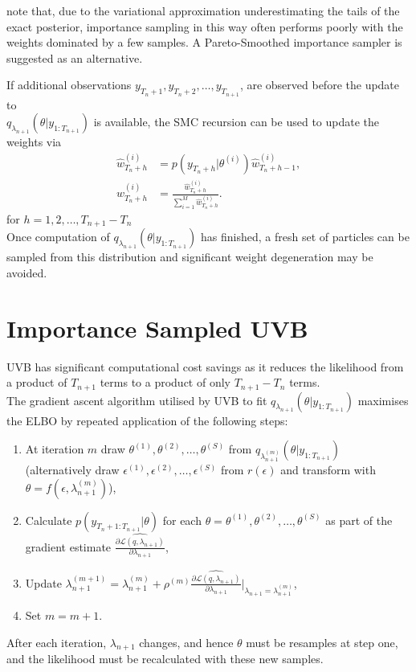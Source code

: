 \documentclass[
12pt, %
onehalfspacing, %
nohyperref, %
headsepline, %
chapterinoneline, %
]{MastersDoctoralThesis} %
\begin{document}
\citet{Yao2018} note that, due to the variational approximation underestimating the tails of the exact posterior, importance sampling in this way often performs poorly with the weights dominated by a few samples. A Pareto-Smoothed importance sampler is suggested as an alternative.

If additional observations $y_{T_n+1}, y_{T_n + 2}, \ldots, y_{T_{n+1}}$, are observed before the update to \\ $q_{\lambda_{n+1}}(\theta | y_{1:T_{n+1}})$ is available, the SMC recursion can be used to update the weights via
\begin{align}
\hat{w}^{(i)}_{T_n+h} &= p(y_{T_n+h} | \theta^{(i)}) \hat{w}^{(i)}_{T_n+h-1}, \label{UVBIS:UpdateWeights} \\
w^{(i)}_{T_n+h} &= \frac{\hat{w}^{(i)}_{T_n+h}}{\sum_{i=1}^M \hat{w}^{(i)}_{T_n+h}}. \label{UVBIS:UpdateWeightsNorm}
\end{align}
for $h = 1, 2, \ldots, T_{n+1} - T_{n}$
\\

Once computation of $q_{\lambda_{n+1}}(\theta | y_{1:T_{n+1}})$ has finished, a fresh set of particles can be sampled from this distribution and significant weight degeneration may be avoided.

\section{Importance Sampled UVB} 
\label{sec:UVBIS}

UVB has significant computational cost savings as it reduces the likelihood from a product of $T_{n+1}$ terms to a product of only $T_{n+1} - T_n$ terms. \\

The gradient ascent algorithm utilised by UVB to fit $q_{\lambda_{n+1}}(\theta | y_{1:T_{n+1}})$ maximises the ELBO by repeated application of the following steps:
\begin{enumerate}
\item At iteration $m$ draw $\theta^{(1)}, \theta^{(2)}, \ldots, \theta^{(S)}$ from $q_{\lambda_{n+1}^{(m)}}(\theta | y_{1:T_{n+1}})$ \\
(alternatively draw $\epsilon^{(1)}, \epsilon^{(2)}, \ldots, \epsilon^{(S)}$ from $r(\epsilon)$ and transform with $\theta = f(\epsilon, \lambda^{(m)}_{n+1})$),
\item Calculate $p(y_{T_{n}+1:T_{n+1}} | \theta)$ for each $\theta = \theta^{(1)}, \theta^{(2)}, \ldots, \theta^{(S)}$ as part of the gradient estimate $\widehat{\frac{\partial\mathcal{L}(q, \lambda_{n+1})}{\partial \lambda_{n+1}}}$,
\item Update $\lambda_{n+1}^{(m+1)} = \lambda_{n+1}^{(m)} + \rho^{(m)}\widehat{\frac{\partial\mathcal{L}(q, \lambda_{n+1})}{\partial \lambda_{n+1}}} \bigg\rvert_{\lambda_{n+1} = \lambda^{(m)}_{n+1}}$,
\item Set $m = m + 1$.
\end{enumerate}
After each iteration, $\lambda_{n+1}$ changes, and hence $\theta$ must be resamples at step one, and the likelihood must be recalculated with these new samples. 
\\
\end{document}
